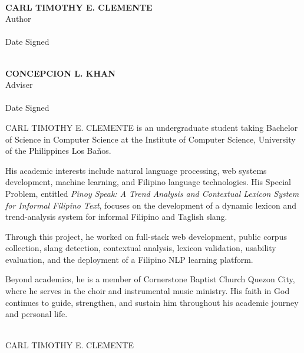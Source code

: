 \documentclass{icsthesis}
\renewcommand{\AUTHOR}{CARL TIMOTHY E. CLEMENTE}
\begin{document}
\begin{frontmatter}
\begin{center}
\makebox[2.5in]{\hrulefill}\\
{\bfseries \AUTHOR}\\
Author\\[0.3em]
\makebox[2.5in]{\hrulefill}\\
Date Signed
\end{center}

\vspace{0.6em}

\begin{center}
\makebox[2.5in]{\hrulefill}\\
{\bfseries CONCEPCION L. KHAN}\\
Adviser\\[0.3em]
\makebox[2.5in]{\hrulefill}\\
Date Signed
\end{center}


\begin{biosketch}

CARL TIMOTHY E. CLEMENTE is an undergraduate student taking Bachelor of Science in Computer Science at the Institute of Computer Science, University of the Philippines Los Ba{\~n}os.

His academic interests include natural language processing, web systems development, machine learning, and Filipino language technologies. His Special Problem, entitled \textit{Pinoy Speak: A Trend Analysis and Contextual Lexicon System for Informal Filipino Text}, focuses on the development of a dynamic lexicon and trend-analysis system for informal Filipino and Taglish slang.

Through this project, he worked on full-stack web development, public corpus collection, slang detection, contextual analysis, lexicon validation, usability evaluation, and the deployment of a Filipino NLP learning platform.

Beyond academics, he is a member of Cornerstone Baptist Church Quezon City, where he serves in the choir and instrumental music ministry. His faith in God continues to guide, strengthen, and sustain him throughout his academic journey and personal life.

\begin{flushright}
\vspace{4ex}
\makebox[2.5in]{\hrulefill}\\
\AUTHOR
\end{flushright}


\end{biosketch}
\end{frontmatter}
\end{document}
